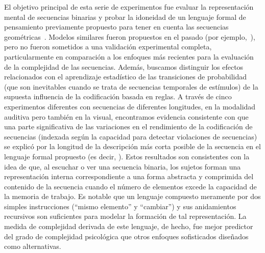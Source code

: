El objetivo principal de esta serie de experimentos fue evaluar la representación mental de secuencias binarias y probar la idoneidad de un lenguaje formal de pensamiento previamente propuesto para tener en cuenta las secuencias geométricas~\cite{amalric2017language}. Modelos similares fueron propuestos en el pasado (por ejemplo,~\cite{f32,f36,f45}), pero no fueron sometidos a una validación experimental completa, particularmente en comparación a los enfoques más recientes para la evaluación de la complejidad de las secuencias. Además, buscamos distinguir los efectos relacionados con el aprendizaje estadístico de las transiciones de probabilidad (que son inevitables cuando se trata de secuencias temporales de estímulos) de la supuesta influencia de la codificación basada en reglas. A través de cinco experimentos diferentes con secuencias de diferentes longitudes, en la modalidad auditiva pero también en la visual, encontramos evidencia consistente con que una parte significativa de las variaciones en el rendimiento de la codificación de secuencias (indexada según la capacidad para detectar violaciones de secuencias) se explicó por la longitud de la descripción más corta posible de la secuencia en el lenguaje formal propuesto (es decir, \mdlbin). Estos resultados son consistentes con la idea de que, al escuchar o ver una secuencia binaria, los sujetos forman una representación interna correspondiente a una forma abstracta y comprimida del contenido de la secuencia cuando el número de elementos excede la capacidad de la memoria de trabajo. Es notable que un lenguaje compuesto meramente por dos simples instrucciones (``mismo elemento'' y ``cambiar'') y sus anidamientos recursivos son suficientes para modelar la formación de tal representación. La medida de complejidad derivada de este lenguaje, de hecho, fue mejor predictor del grado de complejidad psicológica que otros enfoques sofisticados diseñados como alternativas.


